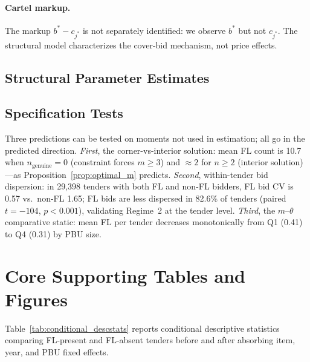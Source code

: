 \paragraph{Cartel markup.}
The markup $b^* - c_{j^*}$ is not separately identified: we observe
$b^*$ but not $c_{j^*}$. The structural model characterizes the
cover-bid mechanism, not price effects.

\subsection{Structural Parameter Estimates}



\subsection{Specification Tests}

Three predictions can be tested on moments not used in estimation; all go in the predicted direction.
\emph{First}, the corner-vs-interior solution: mean FL count is 10.7
when $n_{\text{genuine}} = 0$ (constraint forces $m \geq 3$) and
$\approx 2$ for $n \geq 2$ (interior solution)---as
Proposition~\ref{prop:optimal_m} predicts.
\emph{Second}, within-tender bid dispersion: in 29,398 tenders with
both FL and non-FL bidders, FL bid CV is 0.57 vs.\ non-FL 1.65; FL
bids are less dispersed in 82.6\% of tenders (paired $t = -104$,
$p < 0.001$), validating Regime~2 at the tender level.
\emph{Third}, the $m$--$\theta$ comparative static: mean FL per tender
decreases monotonically from Q1 (0.41) to Q4 (0.31) by PBU size.


\section{Core Supporting Tables and Figures}
\label{app:competition}

Table~\ref{tab:conditional_descstats} reports conditional descriptive
statistics comparing FL-present and FL-absent tenders before and after
absorbing item, year, and PBU fixed effects.








